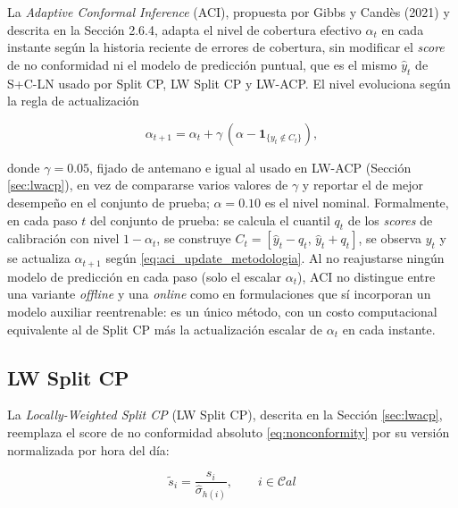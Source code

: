 La \textit{Adaptive Conformal Inference} (ACI), propuesta por Gibbs y Candès (2021) y descrita en la Sección 2.6.4, adapta el nivel de cobertura efectivo $\alpha_t$ en cada instante según la historia reciente de errores de cobertura, sin modificar el \textit{score} de no conformidad ni el modelo de predicción puntual, que es el mismo $\hat{y}_t$ de S+C-LN usado por Split CP, LW Split CP y LW-ACP. El nivel evoluciona según la regla de actualización

\begin{equation}
    \alpha_{t+1} = \alpha_t + \gamma\,(\alpha - \mathbf{1}_{\{y_t \notin C_t\}}),
    \label{eq:aci_update_metodologia}
\end{equation}

donde $\gamma = 0.05$, fijado de antemano e igual al usado en LW-ACP (Sección \ref{sec:lwacp}), en vez de compararse varios valores de $\gamma$ y reportar el de mejor desempeño en el conjunto de prueba; $\alpha = 0.10$ es el nivel nominal. Formalmente, en cada paso $t$ del conjunto de prueba: se calcula el cuantil $q_t$ de los \textit{scores} de calibración con nivel $1-\alpha_t$, se construye $C_t = [\hat{y}_t - q_t,\, \hat{y}_t + q_t]$, se observa $y_t$ y se actualiza $\alpha_{t+1}$ según \eqref{eq:aci_update_metodologia}. Al no reajustarse ningún modelo de predicción en cada paso (solo el escalar $\alpha_t$), ACI no distingue entre una variante \textit{offline} y una \textit{online} como en formulaciones que sí incorporan un modelo auxiliar reentrenable: es un único método, con un costo computacional equivalente al de Split CP más la actualización escalar de $\alpha_t$ en cada instante.

\subsection{LW Split CP}
\label{sec:lw_split_metodologia}

La \textit{Locally-Weighted Split CP} (LW Split CP), descrita en la Sección \ref{sec:lwacp}, reemplaza el score de no conformidad absoluto \eqref{eq:nonconformity} por su versión normalizada por hora del día:

\begin{equation}
    \tilde{s}_i = \frac{s_i}{\hat{\sigma}_{h(i)}}, \qquad i \in \mathcal{C}al
    \label{eq:lw_score_metodologia}
\end{equation}

